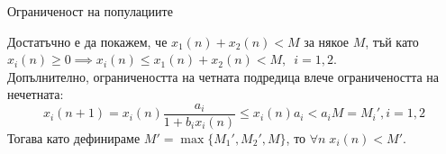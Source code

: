 \begin{frame}[t]{Ограниченост на популациите}

Достатъчно е да покажем, че $x_{1} \left(n \right) + x_{2} \left(n \right) < M$ за някое $M$, тъй като $x_{i} \left(n \right) \geq 0 \implies x_{i} \left(n \right) \leq x_{1} \left(n \right) + x_{2} \left(n \right) < M, \enspace i=1,2$. \\
Допълнително, ограничеността на четната подредица влече ограничеността на нечетната:
\[x_{i} \left(n+1 \right) = x_{i} \left(n \right) \frac{a_{i}}{1 + b_{i} x_{i} \left(n \right)} \leq x_{i} \left(n \right) a_{i} < a_{i} M = M_{i}', i=1, 2\]
Тогава като дефинираме 
$M' = \max \{M_{1}',M_{2}',M\}$, то $\forall{n} \; x_{i} \left(n  \right) < M'$. \\

\end{frame}


